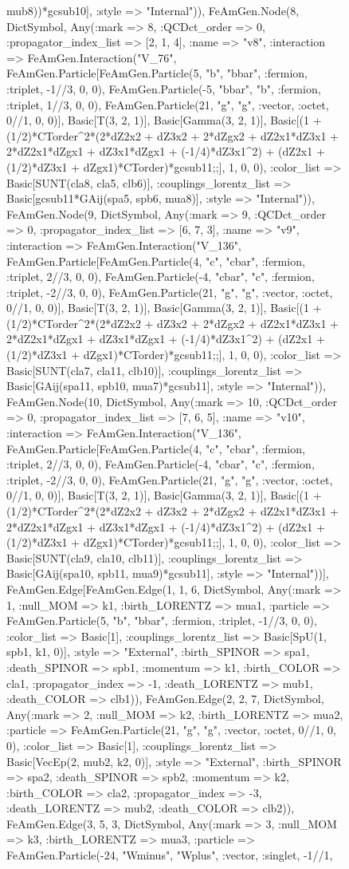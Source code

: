 \documentclass{revtex4}
\begin{document}
\begin{figure}[!htb]
\begin{center}
{mub8))*gcsub10], :style => "Internal")), FeAmGen.Node(8, Dict{Symbol, Any}(:mark => 8, :QCDct_order => 0, :propagator_index_list => [2, 1, 4], :name => "v8", :interaction => FeAmGen.Interaction("V_76", FeAmGen.Particle[FeAmGen.Particle(5, "b", "bbar", :fermion, :triplet, -1//3, 0, 0), FeAmGen.Particle(-5, "bbar", "b", :fermion, :triplet, 1//3, 0, 0), FeAmGen.Particle(21, "g", "g", :vector, :octet, 0//1, 0, 0)], Basic[T(3, 2, 1)], Basic[Gamma(3, 2, 1)], Basic[(1 + (1/2)*CTorder^2*(2*dZ2x2 + dZ3x2 + 2*dZgx2 + dZ2x1*dZ3x1 + 2*dZ2x1*dZgx1 + dZ3x1*dZgx1 + (-1/4)*dZ3x1^2) + (dZ2x1 + (1/2)*dZ3x1 + dZgx1)*CTorder)*gcsub11;;], 1, 0, 0), :color_list => Basic[SUNT(cla8, cla5, clb6)], :couplings_lorentz_list => Basic[gcsub11*GAij(spa5, spb6, mua8)], :style => "Internal")), FeAmGen.Node(9, Dict{Symbol, Any}(:mark => 9, :QCDct_order => 0, :propagator_index_list => [6, 7, 3], :name => "v9", :interaction => FeAmGen.Interaction("V_136", FeAmGen.Particle[FeAmGen.Particle(4, "c", "cbar", :fermion, :triplet, 2//3, 0, 0), FeAmGen.Particle(-4, "cbar", "c", :fermion, :triplet, -2//3, 0, 0), FeAmGen.Particle(21, "g", "g", :vector, :octet, 0//1, 0, 0)], Basic[T(3, 2, 1)], Basic[Gamma(3, 2, 1)], Basic[(1 + (1/2)*CTorder^2*(2*dZ2x2 + dZ3x2 + 2*dZgx2 + dZ2x1*dZ3x1 + 2*dZ2x1*dZgx1 + dZ3x1*dZgx1 + (-1/4)*dZ3x1^2) + (dZ2x1 + (1/2)*dZ3x1 + dZgx1)*CTorder)*gcsub11;;], 1, 0, 0), :color_list => Basic[SUNT(cla7, cla11, clb10)], :couplings_lorentz_list => Basic[GAij(spa11, spb10, mua7)*gcsub11], :style => "Internal")), FeAmGen.Node(10, Dict{Symbol, Any}(:mark => 10, :QCDct_order => 0, :propagator_index_list => [7, 6, 5], :name => "v10", :interaction => FeAmGen.Interaction("V_136", FeAmGen.Particle[FeAmGen.Particle(4, "c", "cbar", :fermion, :triplet, 2//3, 0, 0), FeAmGen.Particle(-4, "cbar", "c", :fermion, :triplet, -2//3, 0, 0), FeAmGen.Particle(21, "g", "g", :vector, :octet, 0//1, 0, 0)], Basic[T(3, 2, 1)], Basic[Gamma(3, 2, 1)], Basic[(1 + (1/2)*CTorder^2*(2*dZ2x2 + dZ3x2 + 2*dZgx2 + dZ2x1*dZ3x1 + 2*dZ2x1*dZgx1 + dZ3x1*dZgx1 + (-1/4)*dZ3x1^2) + (dZ2x1 + (1/2)*dZ3x1 + dZgx1)*CTorder)*gcsub11;;], 1, 0, 0), :color_list => Basic[SUNT(cla9, cla10, clb11)], :couplings_lorentz_list => Basic[GAij(spa10, spb11, mua9)*gcsub11], :style => "Internal"))], FeAmGen.Edge[FeAmGen.Edge(1, 1, 6, Dict{Symbol, Any}(:mark => 1, :null_MOM => k1, :birth_LORENTZ => mua1, :particle => FeAmGen.Particle(5, "b", "bbar", :fermion, :triplet, -1//3, 0, 0), :color_list => Basic[1], :couplings_lorentz_list => Basic[SpU(1, spb1, k1, 0)], :style => "External", :birth_SPINOR => spa1, :death_SPINOR => spb1, :momentum => k1, :birth_COLOR => cla1, :propagator_index => -1, :death_LORENTZ => mub1, :death_COLOR => clb1)), FeAmGen.Edge(2, 2, 7, Dict{Symbol, Any}(:mark => 2, :null_MOM => k2, :birth_LORENTZ => mua2, :particle => FeAmGen.Particle(21, "g", "g", :vector, :octet, 0//1, 0, 0), :color_list => Basic[1], :couplings_lorentz_list => Basic[VecEp(2, mub2, k2, 0)], :style => "External", :birth_SPINOR => spa2, :death_SPINOR => spb2, :momentum => k2, :birth_COLOR => cla2, :propagator_index => -3, :death_LORENTZ => mub2, :death_COLOR => clb2)), FeAmGen.Edge(3, 5, 3, Dict{Symbol, Any}(:mark => 3, :null_MOM => k3, :birth_LORENTZ => mua3, :particle => FeAmGen.Particle(-24, "Wminus", "Wplus", :vector, :singlet, -1//1, }
\end{center}
\end{figure}
\end{document}
